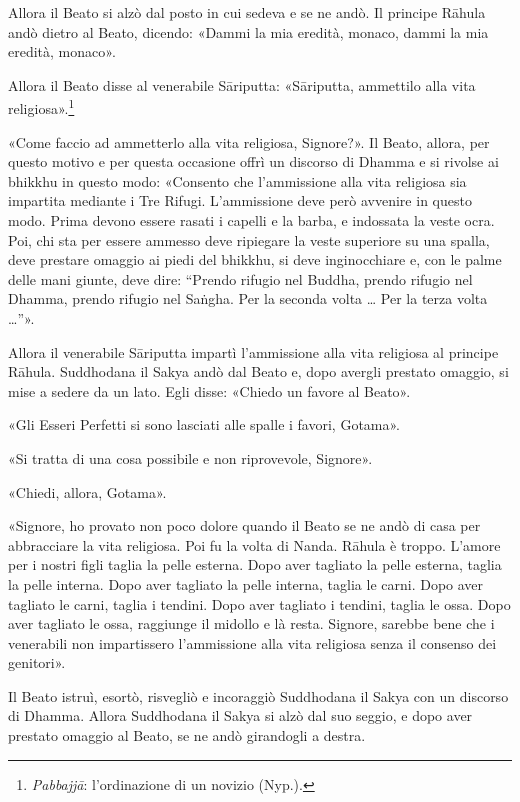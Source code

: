 Allora il Beato si alzò dal posto in cui sedeva e se ne andò. Il
principe Rāhula andò dietro al Beato, dicendo: «Dammi la mia eredità,
monaco, dammi la mia eredità, monaco».


Allora il Beato disse al venerabile Sāriputta: «Sāriputta, ammettilo
alla vita religiosa».\footnote{\emph{Pabbajjā}: l’ordinazione di un novizio (Nyp.).}


«Come faccio ad ammetterlo alla vita religiosa, Signore?». Il Beato,
allora, per questo motivo e per questa occasione offrì un discorso di
Dhamma e si rivolse ai bhikkhu in questo modo: «Consento che
l’ammissione alla vita religiosa sia impartita mediante i Tre Rifugi.
L’ammissione deve però avvenire in questo modo. Prima devono essere
rasati i capelli e la barba, e indossata la veste ocra. Poi, chi sta per
essere ammesso deve ripiegare la veste superiore su una spalla, deve
prestare omaggio ai piedi del bhikkhu, si deve inginocchiare e, con le
palme delle mani giunte, deve dire: “Prendo rifugio nel Buddha, prendo
rifugio nel Dhamma, prendo rifugio nel Saṅgha. Per la seconda volta …
Per la terza volta …”».


Allora il venerabile Sāriputta impartì l’ammissione alla vita religiosa
al principe Rāhula. Suddhodana il Sakya andò dal Beato e, dopo avergli
prestato omaggio, si mise a sedere da un lato. Egli disse: «Chiedo un
favore al Beato».


«Gli Esseri Perfetti si sono lasciati alle spalle i favori, Gotama».


«Si tratta di una cosa possibile e non riprovevole, Signore».


«Chiedi, allora, Gotama».


«Signore, ho provato non poco dolore quando il Beato se ne andò di casa
per abbracciare la vita religiosa. Poi fu la volta di Nanda. Rāhula è
troppo. L’amore per i nostri figli taglia la pelle esterna. Dopo aver
tagliato la pelle esterna, taglia la pelle interna. Dopo aver tagliato
la pelle interna, taglia le carni. Dopo aver tagliato le carni, taglia i
tendini. Dopo aver tagliato i tendini, taglia le ossa. Dopo aver
tagliato le ossa, raggiunge il midollo e là resta. Signore, sarebbe bene
che i venerabili non impartissero l’ammissione alla vita religiosa senza
il consenso dei genitori».


Il Beato istruì, esortò, risvegliò e incoraggiò Suddhodana il Sakya con
un discorso di Dhamma. Allora Suddhodana il Sakya si alzò dal suo
seggio, e dopo aver prestato omaggio al Beato, se ne andò girandogli a
destra.


